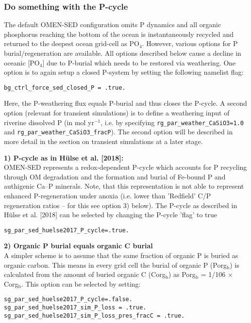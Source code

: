\documentclass[11pt,fleqn]{book} %
\begin{document}
%
\subsubsection*{Do something with the P-cycle}

The default OMEN-SED configuration omits P dynamics and all organic phosphorus reaching the bottom of the ocean is instantaneously recycled and returned to the deepest ocean grid-cell as PO$_4$.
However, various options for P burial/regeneration are available. All options described below cause a decline in oceanic [PO$_4$] due to P-burial which needs to be restored via weathering. One option is to again setup a closed P-system by setting the following namelist flag:
\vspace{-1mm}\begin{verbatim}
bg_ctrl_force_sed_closed_P = .true.
\end{verbatim}\vspace{-1mm}
Here, the P-weathering flux equals P-burial and thus closes the P-cycle. A second option (relevant for transient simulations) is to define a weathering input of riverine dissolved P (in mol yr$^{-1}$, i.e. by specifying
\texttt{rg\_par\_weather\_CaSiO3=1.0} and \texttt{rg\_par\_weather\_CaSiO3\_fracP}). The second option will be described in more detail in the section on transient simulations at a later stage.

\vspace{1mm}
\noindent
\textbf{1) P-cycle as in H\"ulse et al. [2018]:}\\
OMEN-SED represents a redox-dependent P-cycle which accounts for P recycling through OM degradation and the formation and burial of Fe-bound P and authigenic Ca--P minerals. Note, that this representation is not able to represent enhanced P-regeneration under anoxia (i.e. lower than 'Redfield' C/P regeneration ratios -- for this see option 3) below). The P-cycle as described in H\"ulse et al. [2018] can be selected by changing the P-cycle 'flag' to true
\vspace{-1mm}\begin{verbatim}
sg_par_sed_huelse2017_P_cycle=.true.
\end{verbatim}\vspace{-1mm}

\vspace{1mm}
\noindent
\textbf{2) Organic P burial equals organic C burial}\\
A simpler scheme is to assume that the same fraction of organic P is buried as organic carbon. This means in every grid cell the burial of organic P (Porg$_\mathrm{b}$) is calculated from the amount of buried organic C (Corg$_\mathrm{b}$) as
Porg$_\mathrm{b}$ = 1/106 $\times$ Corg$_\mathrm{b}$. This option can be selected by setting:
\vspace{-1mm}\begin{verbatim}
sg_par_sed_huelse2017_P_cycle=.false.
sg_par_sed_huelse2017_sim_P_loss = .true.
sg_par_sed_huelse2017_sim_P_loss_pres_fracC = .true.
\end{verbatim}\vspace{-1mm}
\end{document}
